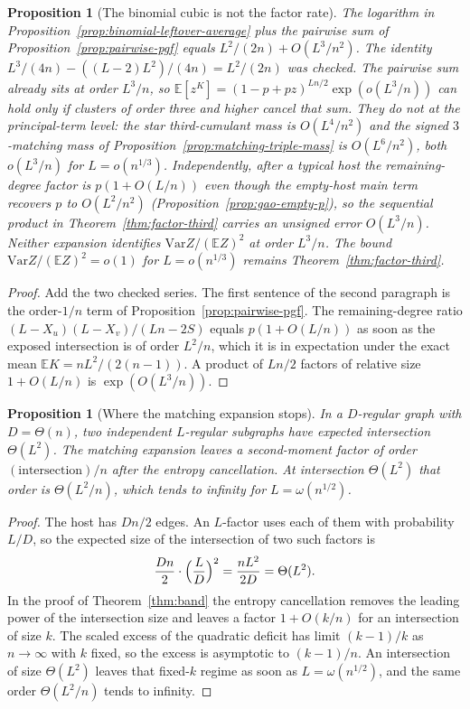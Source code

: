 \documentclass[11pt]{article}
\newtheorem{proposition}[theorem]{Proposition}
\newcommand{\EE}{\mathbb{E}}
\newcommand{\Var}{\mathrm{Var}}
\begin{document}
\begin{proposition}[The binomial cubic is not the factor rate]
\label{prop:cubic-not-identified}
The logarithm in Proposition~\ref{prop:binomial-leftover-average} plus the pairwise sum of Proposition~\ref{prop:pairwise-pgf} equals \(L^2/(2n)+O(L^3/n^2)\).
The identity \(L^3/(4n)-((L-2)L^2)/(4n)=L^2/(2n)\) was checked.
The pairwise sum already sits at order \(L^3/n\), so \(\EE[z^K]=(1-p+pz)^{Ln/2}\exp(o(L^3/n))\) can hold only if clusters of order three and higher cancel that sum.
They do not at the principal-term level: the star third-cumulant mass is \(O(L^4/n^2)\) and the signed \(3\)-matching mass of Proposition~\ref{prop:matching-triple-mass} is \(O(L^6/n^2)\), both \(o(L^3/n)\) for \(L=o(n^{1/3})\).
Independently, after a typical host the remaining-degree factor is \(p(1+O(L/n))\) even though the empty-host main term recovers \(p\) to \(O(L^2/n^2)\) (Proposition~\ref{prop:gao-empty-p}), so the sequential product in Theorem~\ref{thm:factor-third} carries an unsigned error \(O(L^3/n)\).
Neither expansion identifies \(\Var Z/(\EE Z)^2\) at order \(L^3/n\).
The bound \(\Var Z/(\EE Z)^2=o(1)\) for \(L=o(n^{1/3})\) remains Theorem~\ref{thm:factor-third}.
\end{proposition}

\begin{proof}
Add the two checked series.
The first sentence of the second paragraph is the order-\(1/n\) term of Proposition~\ref{prop:pairwise-pgf}.
The remaining-degree ratio \((L-X_u)(L-X_v)/(Ln-2S)\) equals \(p(1+O(L/n))\) as soon as the exposed intersection is of order \(L^2/n\), which it is in expectation under the exact mean \(\EE K=nL^2/(2(n-1))\).
A product of \(Ln/2\) factors of relative size \(1+O(L/n)\) is \(\exp(O(L^3/n))\).
\end{proof}

\begin{proposition}[Where the matching expansion stops]
\label{prop:sqrt-stop}
In a \(D\)-regular graph with \(D=\Theta(n)\), two independent \(L\)-regular subgraphs have expected intersection \(\Theta(L^2)\).
The matching expansion leaves a second-moment factor of order \((\text{intersection})/n\) after the entropy cancellation.
At intersection \(\Theta(L^2)\) that order is \(\Theta(L^2/n)\), which tends to infinity for \(L=\omega(n^{1/2})\).
\end{proposition}

\begin{proof}
The host has \(Dn/2\) edges. An \(L\)-factor uses each of them with probability \(L/D\), so the expected size of the intersection of two such factors is
\[
\frac{Dn}{2}\cdot\Bigl(\frac{L}{D}\Bigr)^2
=
\frac{nL^2}{2D}
=
\Theta(L^2).
\]
In the proof of Theorem~\ref{thm:band} the entropy cancellation removes the leading power of the intersection size and leaves a factor \(1+O(k/n)\) for an intersection of size \(k\).
The scaled excess of the quadratic deficit has limit \((k-1)/k\) as \(n\to\infty\) with \(k\) fixed, so the excess is asymptotic to \((k-1)/n\).
An intersection of size \(\Theta(L^2)\) leaves that fixed-\(k\) regime as soon as \(L=\omega(n^{1/2})\), and the same order \(\Theta(L^2/n)\) tends to infinity.
\end{proof}
\end{document}
